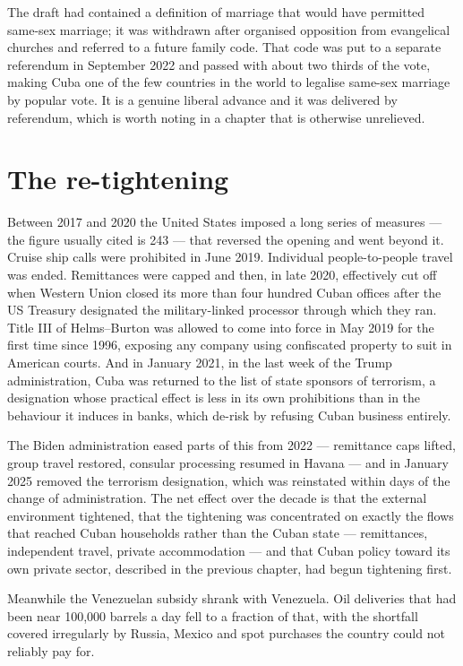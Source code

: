 The draft had contained a definition of marriage that would have permitted
same-sex marriage; it was withdrawn after organised opposition from evangelical
churches and referred to a future family code. That code was put to a separate
referendum in September 2022 and passed with about two thirds of the vote,
making Cuba one of the few countries in the world to legalise same-sex marriage
by popular vote. It is a genuine liberal advance and it was delivered by
referendum, which is worth noting in a chapter that is otherwise unrelieved.

\section{The re-tightening}

Between 2017 and 2020 the United States imposed a long series of measures ---
the figure usually cited is 243 --- that reversed the opening and went beyond
it.\unv{} Cruise ship calls were prohibited in June 2019. Individual
people-to-people travel was ended. Remittances were capped and then, in late
2020, effectively cut off when Western Union closed its more than four hundred
Cuban offices after the US Treasury designated the military-linked processor
through which they ran. Title III of Helms--Burton was allowed to come into
force in May 2019 for the first time since 1996, exposing any company using
confiscated property to suit in American courts. And in January 2021, in the
last week of the Trump administration, Cuba was returned to the list of state
sponsors of terrorism, a designation whose practical effect is less in its own
prohibitions than in the behaviour it induces in banks, which de-risk by
refusing Cuban business entirely.

The Biden administration eased parts of this from 2022 --- remittance caps
lifted, group travel restored, consular processing resumed in Havana --- and in
January 2025 removed the terrorism designation, which was reinstated within days
of the change of administration. The net effect over the decade is that the
external environment tightened, that the tightening was concentrated on exactly
the flows that reached Cuban households rather than the Cuban state ---
remittances, independent travel, private accommodation --- and that Cuban
policy toward its own private sector, described in the previous chapter, had
begun tightening first.

Meanwhile the Venezuelan subsidy shrank with Venezuela. Oil deliveries that had
been near 100,000 barrels a day fell to a fraction of that, with the shortfall
covered irregularly by Russia, Mexico and spot purchases the country could not
reliably pay for.

